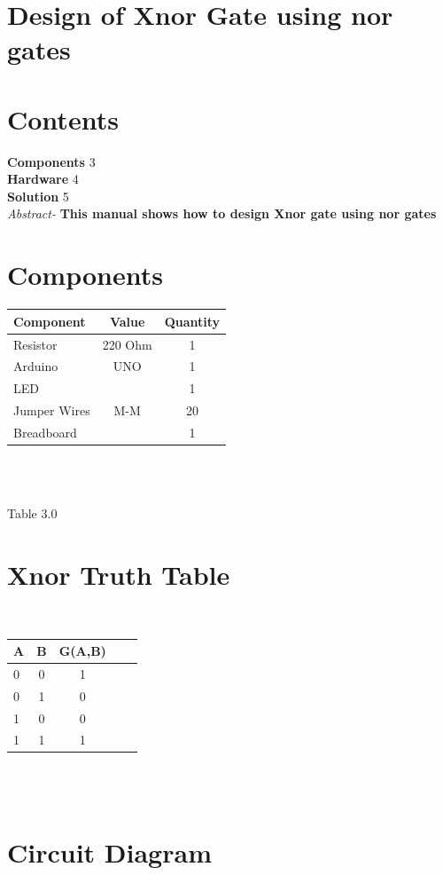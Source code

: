 \documentclass[10pt]{report}
\begin{document}
\begin{multicols}{2} 
\section{Design of Xnor Gate using nor gates}

\section{Contents}
\raggedright
\textbf{Components}
\hspace{10em} 3
\\\textbf{Hardware}
\hspace{11.3em}   4
\\\textbf{Solution}
\hspace{12.1em}   5\\
\textit{Abstract-}
\textbf{This manual shows how to design Xnor gate using nor gates}
\section{Components}
\centering
\begin{tabular}{|l|c|c|}
\hline
Component & Value & Quantity\\
\hline
Resistor & 220 Ohm & 1\\
\hline
Arduino & UNO & 1\\
\hline
LED & & 1\\
\hline
Jumper Wires & M-M & 20\\
\hline
Breadboard & & 1\\
\hline
\end{tabular}\\
\
\centerline{Table 3.0}
\section{Xnor Truth Table}
\raggedright

\
\centering
\\\begin{tabular}{|l|c|c|c|c|} \hline
  \textbf{A}& \textbf{B} & \textbf{G(A,B)}\\ \hline
0&0&1\\ \hline
0&1&0 \\ \hline
1&0&0\\ \hline
1&1&1\\ \hline
\end{tabular}\\
\
\section{Circuit Diagram}


\end{multicols}
\end{document}
